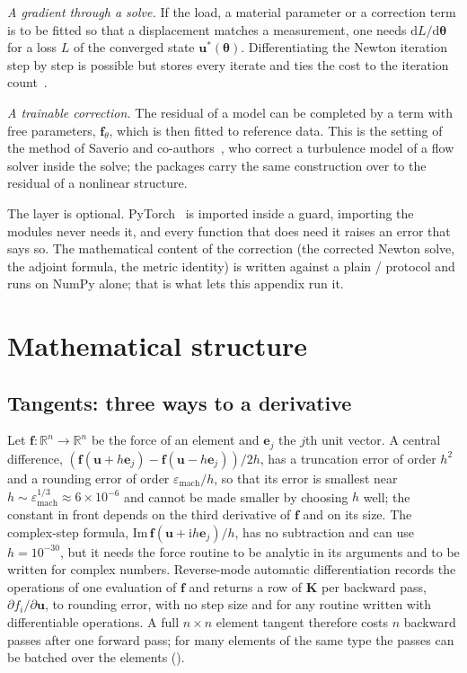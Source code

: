 \emph{A gradient through a solve.} If the load, a material parameter or a correction term is to be fitted so that a displacement matches a measurement, one needs $\mathrm dL/\mathrm d\bm\theta$ for a loss $L$ of the converged state $\bm u^\ast(\bm\theta)$. Differentiating the Newton iteration step by step is possible but stores every iterate and ties the cost to the iteration count~\cite{griewank2008evaluating}.

\emph{A trainable correction.} The residual of a model can be completed by a term with free parameters, $\bm f_\theta$, which is then fitted to reference data. This is the setting of the method of Saverio and co-authors~\cite{saverio2026endtoend}, who correct a turbulence model of a flow solver inside the solve; the packages carry the same construction over to the residual of a nonlinear structure.

The layer is optional. PyTorch~\cite{paszke2019pytorch} is imported inside a guard, importing the modules never needs it, and every function that does need it raises an error that says so. The mathematical content of the correction (the corrected Newton solve, the adjoint formula, the metric identity) is written against a plain / protocol and runs on NumPy alone; that is what lets this appendix run it.

\section{Mathematical structure}\label{sec:df-math}

\subsection{Tangents: three ways to a derivative}\label{sec:df-tangent}

Let $\bm f:\mathbb R^n\to\mathbb R^n$ be the force of an element and $\bm e_j$ the $j$th unit vector. A central difference, $(\bm f(\bm u+h\bm e_j)-\bm f(\bm u-h\bm e_j))/2h$, has a truncation error of order $h^2$ and a rounding error of order $\varepsilon_{\mathrm{mach}}/h$, so that its error is smallest near $h\sim\varepsilon_{\mathrm{mach}}^{1/3}\approx6\times10^{-6}$ and cannot be made smaller by choosing $h$ well; the constant in front depends on the third derivative of $\bm f$ and on its size. The complex-step formula, $\mathrm{Im}\,\bm f(\bm u+\mathrm i h\bm e_j)/h$, has no subtraction and can use $h=10^{-30}$, but it needs the force routine to be analytic in its arguments and to be written for complex numbers. Reverse-mode automatic differentiation records the operations of one evaluation of $\bm f$ and returns a row of $\bm K$ per backward pass, $\partial f_i/\partial\bm u$, to rounding error, with no step size and for any routine written with differentiable operations. A full $n\times n$ element tangent therefore costs $n$ backward passes after one forward pass; for many elements of the same type the passes can be batched over the elements ().

